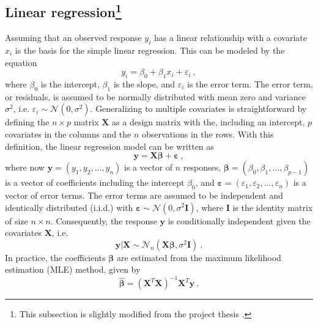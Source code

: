 \subsection{Linear regression\protect\footnote{This subsection is slightly modified from the project thesis \citep{Arnstad}.}}
Assuming that an observed response $y_i$ has a linear relationship with a covariate $x_i$ is the basis for the simple linear regression.
This can be modeled by the equation
\begin{equation}
    y_i = \beta_0 + \beta_1x_i + \varepsilon_i \ ,
\end{equation}
where $\beta_0$ is the intercept, $\beta_1$ is the slope, and $\varepsilon_i$ is the error term.
The error term, or residuals, is assumed to be normally distributed with mean zero and variance $\sigma^2$, i.e. $\varepsilon_i \sim \mathcal{N}(0, \sigma^2)$.
Generalizing to multiple covariates is straightforward by defining the $n\times p$ matrix $\mathbf{X}$ as a design matrix with the, including an intercept, $p$ covariates in the columns and the $n$ observations in the rows.
With this definition, the linear regression model can be written as
\begin{equation}
    \label{eq:linreg}
    \mathbf{y} = \mathbf{X}\boldsymbol{\beta} + \mathbf{\varepsilon} \ ,
\end{equation}
where now $\mathbf{y}=(y_1, y_2, ..., y_n)$ is a vector of $n$ responses, $\boldsymbol{\beta}=(\beta_0, \beta_1, ..., \beta_{p-1})$ is a vector of coefficients including the intercept $\beta_0$, and $\mathbf{\varepsilon}=(\varepsilon_1, \varepsilon_2, ..., \varepsilon_n)$ is a vector of error terms.
The error terms are assumed to be independent and identically distributed (i.i.d.) with $\boldsymbol{\varepsilon} \sim \mathcal{N}(0, \sigma^2 \mathbf{I})$, where $\mathbf{I}$ is the identity matrix of size $n \times n$.
Consequently, the response $\mathbf{y}$ is conditionally independent given the covariates $\mathbf{X}$, i.e.
\begin{equation}
    \mathbf{y} \lvert \mathbf{X} \sim \mathcal{N}_n(\mathbf{X}\boldsymbol{\beta}, \sigma^2\mathbf{I}) \ .
\end{equation}
In practice, the coefficients $\boldsymbol{\beta}$ are estimated from the maximum likelihood estimation (MLE) method, given by
\begin{equation}
    \label{eq:beta_hat}
    \hat{\boldsymbol{\beta}} = (\mathbf{X}^T\mathbf{X})^{-1}\mathbf{X}^T\mathbf{y} \ .
\end{equation}

